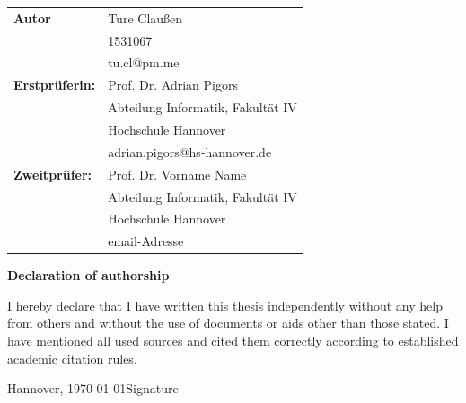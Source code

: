 \documentclass[fontsize=12pt,paper=a4,twoside,parskip=half-,headsepline,headinclude]{scrreprt}
\begin{document}
\newpage \thispagestyle{empty}
\begin{tabular}{ll}
  {\bfseries\sffamily Autor}         & Ture Claußen                      \\
                                     & 1531067                           \\
                                     & tu.cl@pm.me                       \\[5ex]
  {\bfseries\sffamily Erstprüferin:} & Prof. Dr. Adrian Pigors           \\
                                     & Abteilung Informatik, Fakultät IV \\
                                     & Hochschule Hannover               \\
                                     & adrian.pigors@hs-hannover.de      \\[5ex]
  {\bfseries\sffamily Zweitprüfer:}  & Prof. Dr. Vorname Name            \\
                                     & Abteilung Informatik, Fakultät IV \\
                                     & Hochschule Hannover               \\
                                     & email-Adresse
\end{tabular}

\vfill

\begin{center} \sffamily\bfseries Declaration of authorship \end{center}

I hereby declare that I have written this thesis independently without any help from others and without the use of documents or aids other than those stated. I have mentioned all used sources and cited them correctly according to established academic citation rules.
\vspace*{7ex}

Hannover, \today \hfill Signature
\tableofcontents

\listoffigures

\listoftables






\end{document}
